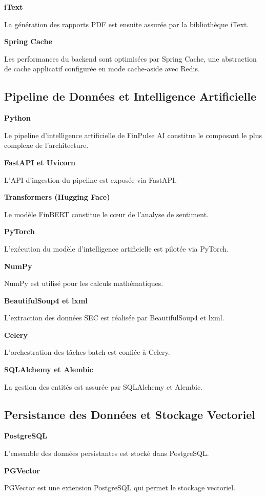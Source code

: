\textbf{iText}

La génération des rapports PDF est ensuite assurée par la bibliothèque iText.

\textbf{Spring Cache}

Les performances du backend sont optimisées par Spring Cache, une abstraction de cache applicatif configurée en mode cache-aside avec Redis.

\subsection{Pipeline de Données et Intelligence Artificielle}

\textbf{Python}

Le pipeline d'intelligence artificielle de FinPulse AI constitue le composant le plus complexe de l'architecture.

\textbf{FastAPI et Uvicorn}

L'API d'ingestion du pipeline est exposée via FastAPI.

\textbf{Transformers (Hugging Face)}

Le modèle FinBERT constitue le cœur de l'analyse de sentiment.

\textbf{PyTorch}

L'exécution du modèle d’intelligence artificielle est pilotée via PyTorch.

\textbf{NumPy}

NumPy est utilisé pour les calculs mathématiques.

\textbf{BeautifulSoup4 et lxml}

L'extraction des données SEC est réalisée par BeautifulSoup4 et lxml.

\textbf{Celery}

L'orchestration des tâches batch est confiée à Celery.

\textbf{SQLAlchemy et Alembic}

La gestion des entités est assurée par SQLAlchemy et Alembic.

\subsection{Persistance des Données et Stockage Vectoriel}

\textbf{PostgreSQL}

L'ensemble des données persistantes est stocké dans PostgreSQL.

\textbf{PGVector}

PGVector est une extension PostgreSQL qui permet le stockage vectoriel.

